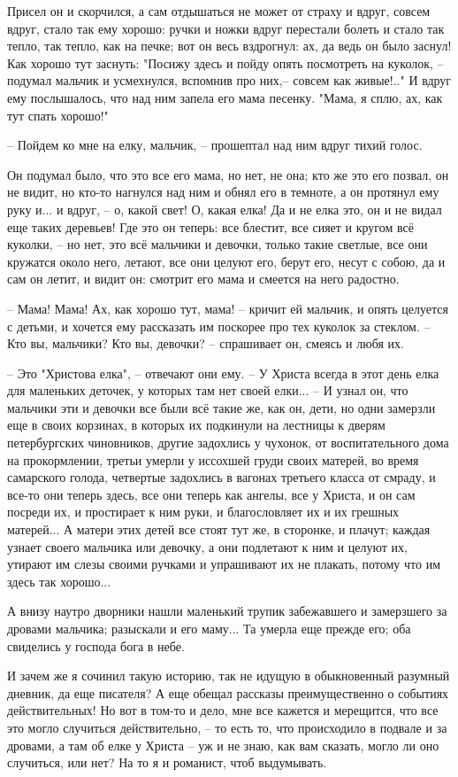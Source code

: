 \documentclass[a4paper, 10pt]{article}
\begin{document}
    Присел он и скорчился, а сам отдышаться не может от страху и вдруг, совсем вдруг, стало так ему хорошо: ручки и ножки вдруг перестали болеть и стало так тепло, так тепло, как на печке; вот он весь вздрогнул: ах, да ведь он было заснул! Как хорошо тут заснуть: "Посижу здесь и пойду опять посмотреть на куколок, -- подумал мальчик и усмехнулся, вспомнив про них,-- совсем как живые!.." И вдруг ему послышалось, что над ним запела его мама песенку. "Мама, я сплю, ах, как тут спать хорошо!" 
    
    -- Пойдем ко мне на елку, мальчик, -- прошептал над ним вдруг тихий голос. 
    
    Он подумал было, что это все его мама, но нет, не она; кто же это его позвал, он не видит, но кто-то нагнулся над ним и обнял его в темноте, а он протянул ему руку и... и вдруг, -- о, какой свет! О, какая елка! Да и не елка это, он и не видал еще таких деревьев! Где это он теперь: все блестит, все сияет и кругом всё куколки, -- но нет, это всё мальчики и девочки, только такие светлые, все они кружатся около него, летают, все они целуют его, берут его, несут с собою, да и сам он летит, и видит он: смотрит его мама и смеется на него радостно. 
    
    -- Мама! Мама! Ах, как хорошо тут, мама! -- кричит ей мальчик, и опять целуется с детьми, и хочется ему рассказать им поскорее про тех куколок за стеклом. -- Кто вы, мальчики? Кто вы, девочки? -- спрашивает он, смеясь и любя их. 
    
    -- Это "Христова елка", -- отвечают они ему. -- У Христа всегда в этот день елка для маленьких деточек, у которых там нет своей елки... -- И узнал он, что мальчики эти и девочки все были всё такие же, как он, дети, но одни замерзли еще в своих корзинах, в которых их подкинули на лестницы к дверям петербургских чиновников, другие задохлись у чухонок, от воспитательного дома на прокормлении, третьи умерли у иссохшей груди своих матерей, во время самарского голода, четвертые задохлись в вагонах третьего класса от смраду, и все-то они теперь здесь, все они теперь как ангелы, все у Христа, и он сам посреди их, и простирает к ним руки, и благословляет их и их грешных матерей... А матери этих детей все стоят тут же, в сторонке, и плачут; каждая узнает своего мальчика или девочку, а они подлетают к ним и целуют их, утирают им слезы своими ручками и упрашивают их не плакать, потому что им здесь так хорошо... 
    
    А внизу наутро дворники нашли маленький трупик забежавшего и замерзшего за дровами мальчика; разыскали и его маму... Та умерла еще прежде его; оба свиделись у господа бога в небе. 
    
    \vspace{3ex}
    
    И зачем же я сочинил такую историю, так не идущую в обыкновенный разумный дневник, да еще писателя? А еще обещал рассказы преимущественно о событиях действительных! Но вот в том-то и дело, мне все кажется и мерещится, что все это могло случиться действительно, -- то есть то, что происходило в подвале и за дровами, а там об елке у Христа -- уж и не знаю, как вам сказать, могло ли оно случиться, или нет? На то я и романист, чтоб выдумывать.
\end{document}
